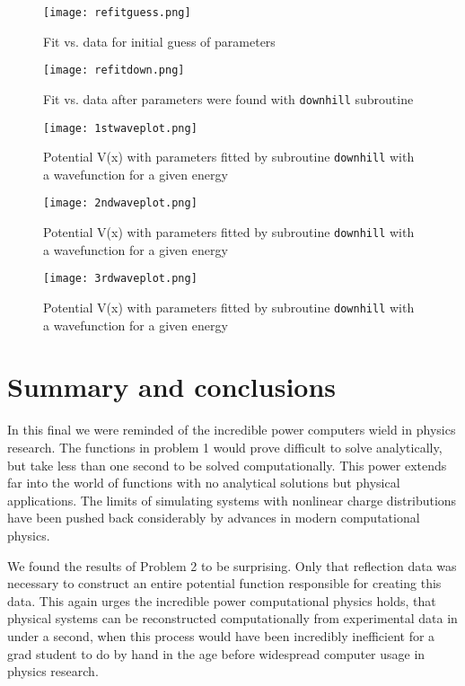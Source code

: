 \documentclass[12pt]{article}
\begin{document}
\begin{figure}[H]
\texttt{[image: refitguess.png]}
\caption{Fit vs. data for initial guess of parameters}
\label{refitguess}
\end{figure}

\begin{figure}[H]
\texttt{[image: refitdown.png]}
\caption{Fit vs. data after parameters were found with {\tt downhill} subroutine}
\label{refitdown}
\end{figure}

\begin{figure}[H]
\texttt{[image: 1stwaveplot.png]}
\caption{Potential V(x) with parameters fitted by subroutine {\tt downhill} with a wavefunction for a given energy}
\label{1stwaveplot}
\end{figure}

\begin{figure}[H]
\texttt{[image: 2ndwaveplot.png]}
\caption{Potential V(x) with parameters fitted by subroutine {\tt downhill} with a wavefunction for a given energy}
\label{2ndwaveplot}
\end{figure}

\begin{figure}[H]
\texttt{[image: 3rdwaveplot.png]}
\caption{Potential V(x) with parameters fitted by subroutine {\tt downhill} with a wavefunction for a given energy}
\label{3rdwaveplot}
\end{figure}

\section{Summary and conclusions}

In this final we were reminded of the incredible power computers wield in physics research.  The functions in problem 1 would prove difficult to solve analytically, but take less than one second to be solved computationally.  This power extends far into the world of functions with no analytical solutions but physical applications.  The limits of simulating systems with nonlinear charge distributions have been pushed back considerably by advances in modern computational physics.  

We found the results of Problem 2 to be surprising.  Only that reflection data was necessary to construct an entire potential function responsible for creating this data.  This again urges the incredible power computational physics holds, that physical systems can be reconstructed computationally from experimental data in under a second, when this process would have been incredibly inefficient for a grad student to do by hand in the age before widespread computer usage in physics research.
\end{document}
